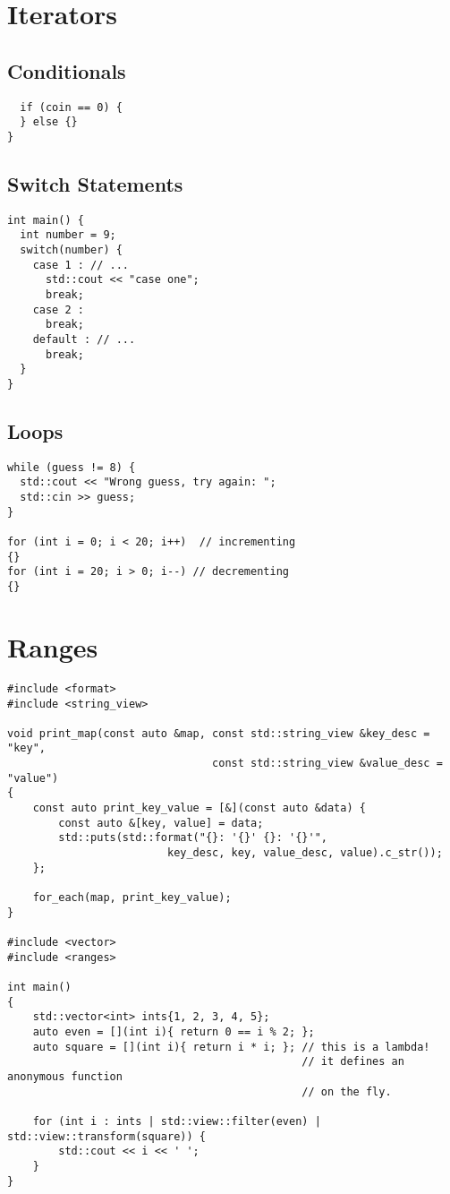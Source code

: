 \documentclass[openany]{report}
\begin{document}
\section{Iterators}
\subsection{Conditionals}

\begin{verbatim}
  if (coin == 0) {
  }	else {}
}
\end{verbatim}

\subsection{Switch Statements}

\begin{verbatim}
int main() {
  int number = 9;
  switch(number) {
    case 1 : // ...
      std::cout << "case one";
      break;
    case 2 :
      break;
    default : // ...
      break;
  }
}
\end{verbatim}

\subsection{Loops}

\begin{verbatim}
while (guess != 8) {
  std::cout << "Wrong guess, try again: ";
  std::cin >> guess;
}

for (int i = 0; i < 20; i++)  // incrementing
{}
for (int i = 20; i > 0; i--) // decrementing
{}
\end{verbatim}

\section{Ranges}

\begin{verbatim}
#include <format>
#include <string_view>

void print_map(const auto &map, const std::string_view &key_desc = "key",
                                const std::string_view &value_desc = "value")
{
    const auto print_key_value = [&](const auto &data) { 
        const auto &[key, value] = data;
        std::puts(std::format("{}: '{}' {}: '{}'",
                         key_desc, key, value_desc, value).c_str());
    };

    for_each(map, print_key_value);
}

#include <vector>
#include <ranges>

int main()
{
    std::vector<int> ints{1, 2, 3, 4, 5};
    auto even = [](int i){ return 0 == i % 2; };
    auto square = [](int i){ return i * i; }; // this is a lambda!
                                              // it defines an anonymous function
                                              // on the fly.

    for (int i : ints | std::view::filter(even) | std::view::transform(square)) {
        std::cout << i << ' ';
    }
}
\end{verbatim}
\end{document}

